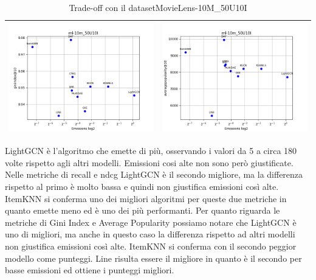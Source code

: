\begin{table}[H]
\begin{tabularx}{\textwidth}{|X|X|}
        \includegraphics[width=\linewidth, trim=0 0 0 0]{images/giniindex@10_ml-10m_50U10I.png} &
        \includegraphics[width=\linewidth, trim=0 0 0 0]{images/averagepopularity@10_ml-10m_50U10I.png} \\
        \hline
    \end{tabularx}
    \caption{Trade-off con il datasetMovieLens-10M\_50U10I}
    \label{tab:emissions_info}
\end{table}


\noindent LightGCN è l'algoritmo che emette di più, osservando i valori da 5 a circa 180 volte rispetto agli altri modelli.
Emissioni cosi alte non sono però giustificate. Nelle metriche di recall e ndcg LightGCN è il secondo migliore, ma la differenza rispetto al primo è molto bassa e quindi non giustifica emissioni così alte.
ItemKNN si conferma uno dei migliori algoritmi per queste due metriche in quanto emette meno ed è uno dei più performanti.
Per quanto riguarda le metriche di Gini Index e Average Popularity possiamo notare che LightGCN è uno di migliori, ma anche in questo caso la differenza rispetto ad altri modelli non giustifica emissioni così alte. ItemKNN si conferma con il secondo peggior modello come punteggi. Line risulta essere il migliore in quanto è il secondo per basse emissioni ed ottiene i punteggi migliori. 

